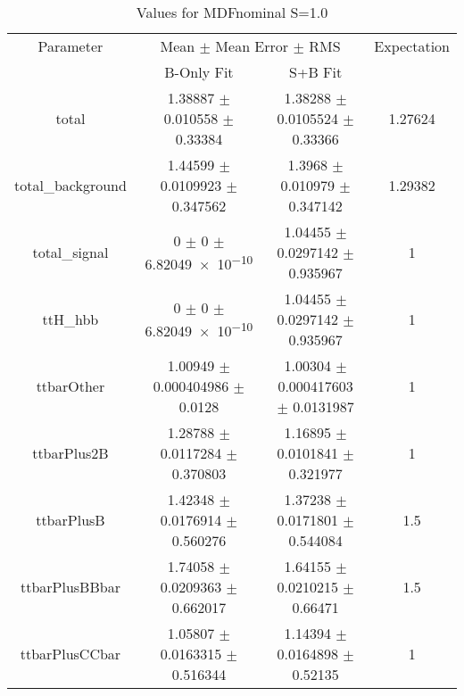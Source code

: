 \begin{table}
\centering
\caption{Values for MDFnominal S=1.0}
\begin{tabular}{cccc}
\toprule
Parameter & \multicolumn{2}{c}{Mean $\pm$ Mean Error $\pm$ RMS} & Expectation\\
 & B-Only Fit & S+B Fit & \\
\midrule
total & \num{1.38887} $\pm$ \num{0.010558} $\pm$ \num{0.33384} & \num{1.38288} $\pm$ \num{0.0105524} $\pm$ \num{0.33366} & \num{1.27624}\\
total\_background & \num{1.44599} $\pm$ \num{0.0109923} $\pm$ \num{0.347562} & \num{1.3968} $\pm$ \num{0.010979} $\pm$ \num{0.347142} & \num{1.29382}\\
total\_signal & \num{0} $\pm$ \num{0} $\pm$ \num{6.82049e-10} & \num{1.04455} $\pm$ \num{0.0297142} $\pm$ \num{0.935967} & \num{1}\\
ttH\_hbb & \num{0} $\pm$ \num{0} $\pm$ \num{6.82049e-10} & \num{1.04455} $\pm$ \num{0.0297142} $\pm$ \num{0.935967} & \num{1}\\
ttbarOther & \num{1.00949} $\pm$ \num{0.000404986} $\pm$ \num{0.0128} & \num{1.00304} $\pm$ \num{0.000417603} $\pm$ \num{0.0131987} & \num{1}\\
ttbarPlus2B & \num{1.28788} $\pm$ \num{0.0117284} $\pm$ \num{0.370803} & \num{1.16895} $\pm$ \num{0.0101841} $\pm$ \num{0.321977} & \num{1}\\
ttbarPlusB & \num{1.42348} $\pm$ \num{0.0176914} $\pm$ \num{0.560276} & \num{1.37238} $\pm$ \num{0.0171801} $\pm$ \num{0.544084} & \num{1.5}\\
ttbarPlusBBbar & \num{1.74058} $\pm$ \num{0.0209363} $\pm$ \num{0.662017} & \num{1.64155} $\pm$ \num{0.0210215} $\pm$ \num{0.66471} & \num{1.5}\\
ttbarPlusCCbar & \num{1.05807} $\pm$ \num{0.0163315} $\pm$ \num{0.516344} & \num{1.14394} $\pm$ \num{0.0164898} $\pm$ \num{0.52135} & \num{1}\\
\bottomrule
\end{tabular}
\end{table}